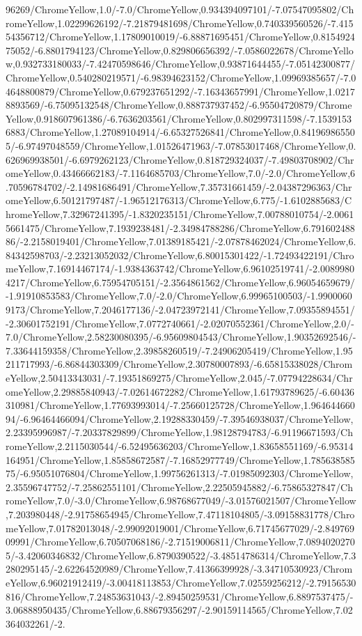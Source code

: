 {\begin{tikzternal}
96269/ChromeYellow,1.0/-7.0/ChromeYellow,0.934394097101/-7.07547095802/ChromeYellow,1.02299626192/-7.21879481698/ChromeYellow,0.740339560526/-7.41554356712/ChromeYellow,1.17809010019/-6.88871695451/ChromeYellow,0.815492475052/-6.8801794123/ChromeYellow,0.829806656392/-7.0586022678/ChromeYellow,0.932733180033/-7.42470598646/ChromeYellow,0.93871644455/-7.05142300877/ChromeYellow,0.540280219571/-6.98394623152/ChromeYellow,1.09969385657/-7.04648800879/ChromeYellow,0.679237651292/-7.16343657991/ChromeYellow,1.02178893569/-6.75095132548/ChromeYellow,0.888737937452/-6.95504720879/ChromeYellow,0.918607961386/-6.7636203561/ChromeYellow,0.802997311598/-7.15391536883/ChromeYellow,1.27089104914/-6.65327526841/ChromeYellow,0.841969865505/-6.97497048559/ChromeYellow,1.01526471963/-7.07853017468/ChromeYellow,0.626969938501/-6.6979262123/ChromeYellow,0.818729324037/-7.49803708902/ChromeYellow,0.43466662183/-7.1164685703/ChromeYellow,7.0/-2.0/ChromeYellow,6.70596784702/-2.14981686491/ChromeYellow,7.35731661459/-2.04387296363/ChromeYellow,6.50121797487/-1.96512176313/ChromeYellow,6.775/-1.6102885683/ChromeYellow,7.32967241395/-1.8320235151/ChromeYellow,7.00788010754/-2.00615661475/ChromeYellow,7.1939238481/-2.34984788286/ChromeYellow,6.79160248886/-2.2158019401/ChromeYellow,7.01389185421/-2.07878462024/ChromeYellow,6.84342598703/-2.23213052032/ChromeYellow,6.80015301422/-1.72493422191/ChromeYellow,7.16914467174/-1.9384363742/ChromeYellow,6.96102519741/-2.00899804217/ChromeYellow,6.75954705151/-2.3564861562/ChromeYellow,6.96054659679/-1.91910853583/ChromeYellow,7.0/-2.0/ChromeYellow,6.99965100503/-1.99000609173/ChromeYellow,7.2046177136/-2.04723972141/ChromeYellow,7.09355894551/-2.30601752191/ChromeYellow,7.0772740661/-2.02070552361/ChromeYellow,2.0/-7.0/ChromeYellow,2.58230080395/-6.95609804543/ChromeYellow,1.90352692546/-7.33644159358/ChromeYellow,2.39858260519/-7.24906205419/ChromeYellow,1.95211717993/-6.86844303309/ChromeYellow,2.30780007893/-6.65815338028/ChromeYellow,2.50413343031/-7.19351869275/ChromeYellow,2.045/-7.07794228634/ChromeYellow,2.29885840943/-7.02614672282/ChromeYellow,1.61793789625/-6.60436310981/ChromeYellow,1.77693993014/-7.25660125728/ChromeYellow,1.96464466094/-6.96464466094/ChromeYellow,2.19288330459/-7.39546938037/ChromeYellow,2.23395996987/-7.20337829899/ChromeYellow,1.98128794783/-6.91196671593/ChromeYellow,2.2115030544/-6.52495636203/ChromeYellow,1.83658551169/-6.95314164951/ChromeYellow,1.85858672587/-7.16852977749/ChromeYellow,1.78563858575/-6.95051076804/ChromeYellow,1.99756261313/-7.01985092303/ChromeYellow,2.35596747752/-7.25862551101/ChromeYellow,2.22505945882/-6.75865327847/ChromeYellow,7.0/-3.0/ChromeYellow,6.98768677049/-3.01576021507/ChromeYellow,7.203980448/-2.91758654945/ChromeYellow,7.47118104805/-3.09158831778/ChromeYellow,7.01782013048/-2.99092019001/ChromeYellow,6.71745677029/-2.84976909991/ChromeYellow,6.70507068186/-2.71519006811/ChromeYellow,7.08940202705/-3.42060346832/ChromeYellow,6.8790390522/-3.48514786314/ChromeYellow,7.3280295145/-2.62264520989/ChromeYellow,7.41366399928/-3.34710530923/ChromeYellow,6.96021912419/-3.00418113853/ChromeYellow,7.02559256212/-2.79156530816/ChromeYellow,7.24853631043/-2.89450259531/ChromeYellow,6.8897537475/-3.06888950435/ChromeYellow,6.88679356297/-2.90159114565/ChromeYellow,7.02364032261/-2.
\end{tikzternal}}
